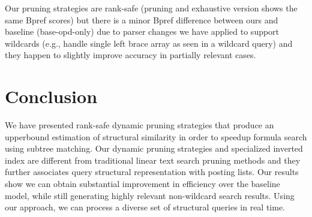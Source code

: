 \documentclass[runningheads]{llncs}
\begin{document}
Our pruning strategies are rank-safe (pruning and exhaustive version shows the same Bpref scores) but there is a minor Bpref difference between ours and baseline (base-opd-only) due to parser changes we have applied to support wildcards (e.g., handle single left brace array as seen in a wildcard query) and they happen to slightly improve accuracy in partially relevant cases.


\section{Conclusion}
We have presented rank-safe dynamic pruning strategies that produce an upperbound estimation of structural similarity in order to speedup formula search using subtree matching.
Our dynamic pruning strategies and specialized inverted index are different from traditional linear text search pruning methods and they further associates query structural representation with posting lists.
Our results show we can obtain substantial improvement in efficiency over the baseline model, while still generating highly relevant non-wildcard search results.
Using our approach, we can process a diverse set of structural queries in real time.


\end{document}
